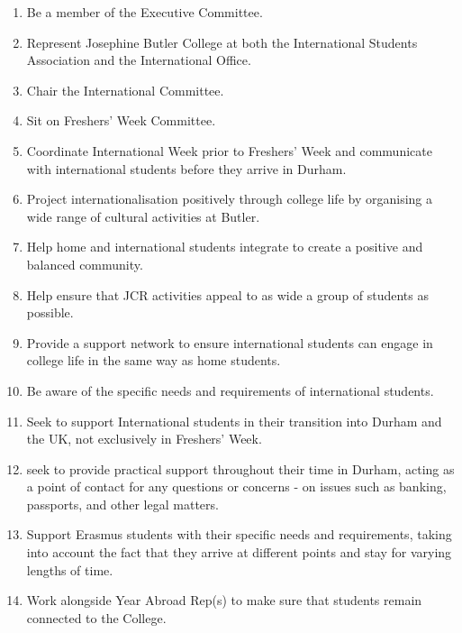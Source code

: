 \begin{enumerate}
    \item Be a member of the Executive Committee.
    \item Represent Josephine Butler College at both the International Students Association and the International Office. 
    \item Chair the International Committee.
    \item Sit on Freshers' Week Committee.
    \item Coordinate International Week prior to Freshers' Week and communicate with international students before they arrive in Durham.
    \item Project internationalisation positively through college life by organising a wide range of cultural activities at Butler.
    \item Help home and international students integrate to create a positive and balanced community.
    \item Help ensure that JCR activities appeal to as wide a group of students as possible.
    \item Provide a support network to ensure international students can engage in college life in the same way as home students.
    \item Be aware of the specific needs and requirements of international students.
    \item Seek to support International students in their transition into Durham and the UK, not exclusively in Freshers’ Week.
    \item seek to provide practical support throughout their time in Durham, acting as a point of contact for any questions or concerns - on issues such as banking, passports, and other legal matters.
    \item Support Erasmus students with their specific needs and requirements, taking into account the fact that they arrive at different points and stay for varying lengths of time. 
    \item Work alongside Year Abroad Rep(s) to make sure that students remain connected to the College.
\end{enumerate}

